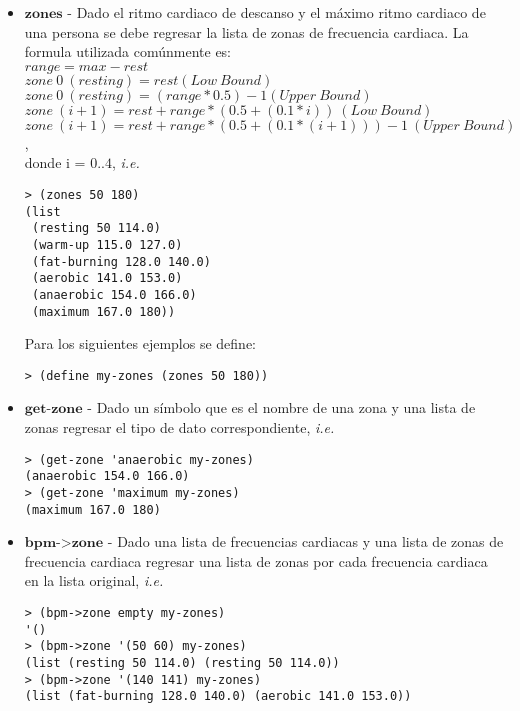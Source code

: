 \documentclass{article}
\begin{document}
\begin{itemize}
\item $\textbf{zones}$ - Dado el ritmo cardiaco de descanso y el máximo ritmo cardiaco de una persona se debe regresar la lista de zonas de frecuencia cardiaca. La formula utilizada comúnmente es:\\
  $range = max - rest$\\
  $zone\ 0\ (resting) = rest (Low\ Bound)$\\
  $zone\ 0\ (resting) = (range * 0.5) - 1 (Upper\ Bound)$\\
  $zone\ (i+1) = rest + range * (0.5 + (0.1 * i))\ (Low\ Bound)$\\
  $zone\ (i+1) = rest + range * (0.5 + (0.1 * (i+1))) - 1\ (Upper\ Bound)$,\\
  donde i = $0..4$, \textit{i.e.}

\begin{verbatim}
> (zones 50 180)
(list
 (resting 50 114.0)
 (warm-up 115.0 127.0)
 (fat-burning 128.0 140.0)
 (aerobic 141.0 153.0)
 (anaerobic 154.0 166.0)
 (maximum 167.0 180))
\end{verbatim}

Para los siguientes ejemplos se define:
\begin{verbatim}
> (define my-zones (zones 50 180))
\end{verbatim}

\item $\textbf{get-zone}$ - Dado un símbolo que es el nombre de una zona y una lista de zonas regresar el tipo de dato correspondiente, \textit{i.e.}
\begin{verbatim}
> (get-zone 'anaerobic my-zones)
(anaerobic 154.0 166.0)
> (get-zone 'maximum my-zones)
(maximum 167.0 180)
\end{verbatim}

\item $\textbf{bpm->zone}$ - Dado una lista de frecuencias cardiacas y una lista de zonas de frecuencia cardiaca regresar una lista de zonas por cada frecuencia cardiaca en la lista original, \textit{i.e.}
\begin{verbatim}
> (bpm->zone empty my-zones)
'()
> (bpm->zone '(50 60) my-zones) 
(list (resting 50 114.0) (resting 50 114.0))
> (bpm->zone '(140 141) my-zones) 
(list (fat-burning 128.0 140.0) (aerobic 141.0 153.0))
\end{verbatim}


\end{itemize}
\end{document}
